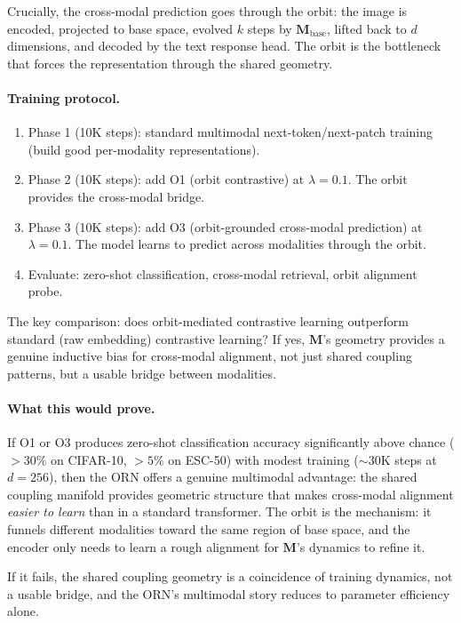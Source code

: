 \documentclass[11pt, a4paper]{article}
\newcommand{\M}{\mathbf{M}}
\theoremstyle{plain}
\theoremstyle{remark}
\begin{document}
Crucially, the cross-modal prediction goes through the orbit: the image is encoded, projected to base space, evolved $k$ steps by $\M_{\text{base}}$, lifted back to $d$ dimensions, and decoded by the text response head.
The orbit is the bottleneck that forces the representation through the shared geometry.

\paragraph{Training protocol.}
\begin{enumerate}[nosep]
    \item Phase 1 (10K steps): standard multimodal next-token/next-patch training (build good per-modality representations).
    \item Phase 2 (10K steps): add O1 (orbit contrastive) at $\lambda{=}0.1$.
    The orbit provides the cross-modal bridge.
    \item Phase 3 (10K steps): add O3 (orbit-grounded cross-modal prediction) at $\lambda{=}0.1$.
    The model learns to predict across modalities through the orbit.
    \item Evaluate: zero-shot classification, cross-modal retrieval, orbit alignment probe.
\end{enumerate}

The key comparison: does orbit-mediated contrastive learning outperform standard (raw embedding) contrastive learning?
If yes, $\M$'s geometry provides a genuine inductive bias for cross-modal alignment, not just shared coupling patterns, but a usable bridge between modalities.

\paragraph{What this would prove.}
If O1 or O3 produces zero-shot classification accuracy significantly above chance (${>}30\%$ on CIFAR-10, ${>}5\%$ on ESC-50) with modest training ($\sim$30K steps at $d{=}256$), then the ORN offers a genuine multimodal advantage: the shared coupling manifold provides geometric structure that makes cross-modal alignment \emph{easier to learn} than in a standard transformer.
The orbit is the mechanism: it funnels different modalities toward the same region of base space, and the encoder only needs to learn a rough alignment for $\M$'s dynamics to refine it.

If it fails, the shared coupling geometry is a coincidence of training dynamics, not a usable bridge, and the ORN's multimodal story reduces to parameter efficiency alone.
\end{document}
